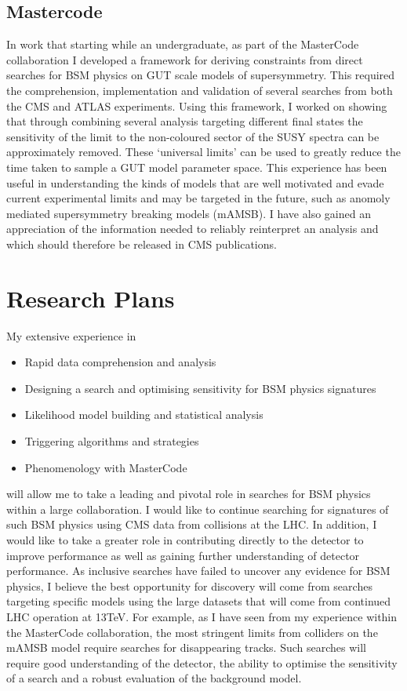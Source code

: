 \documentclass[11pt]{article}
\theoremstyle{plain} \numberwithin{equation}{section}
\theoremstyle{definition}
\begin{document}
\subsection*{Mastercode}
In work that starting while an undergraduate, as part of the MasterCode collaboration I developed a framework for 
deriving constraints from direct searches for BSM physics on GUT scale models of supersymmetry. 
This required the comprehension, implementation and validation of several 
searches from both the CMS and ATLAS experiments. Using this framework, I worked on
showing that through combining several analysis targeting different final states the sensitivity of the 
limit to the non-coloured sector of the SUSY spectra can be approximately removed. 
These `universal limits' can be used to greatly reduce the 
time taken to sample a GUT model parameter space. This experience has been useful in understanding
the kinds of models that are well motivated and evade current experimental limits and may be targeted in the 
future, such as anomoly mediated supersymmetry breaking models (mAMSB). I have also gained an appreciation
of the information needed to reliably reinterpret an analysis and which should therefore be released in CMS publications.

\section*{Research Plans}

My extensive experience in

\begin{itemize}
\item Rapid data comprehension and analysis
\item Designing a search and optimising sensitivity for BSM physics signatures
\item Likelihood model building and statistical analysis 
\item Triggering algorithms and strategies
\item Phenomenology with MasterCode
\end{itemize}

will allow me to take a leading and pivotal role in searches for BSM physics within a large collaboration.
I would like to continue searching for signatures of such BSM physics using CMS data from collisions at the LHC.
In addition, I would like to take a greater role in contributing directly to the detector to improve performance
as well as gaining further understanding of detector performance. As inclusive searches have failed 
to uncover any evidence for BSM physics, I believe the best opportunity for discovery will 
come from searches targeting specific models using the large datasets that will come
from continued LHC operation at 13TeV. For example, as I have seen from my experience within 
the MasterCode collaboration, the most stringent limits from colliders on the mAMSB 
model require searches for disappearing tracks. Such searches will require good understanding of the detector,
the ability to optimise the sensitivity of a search and a robust evaluation of the background model.
\end{document}
